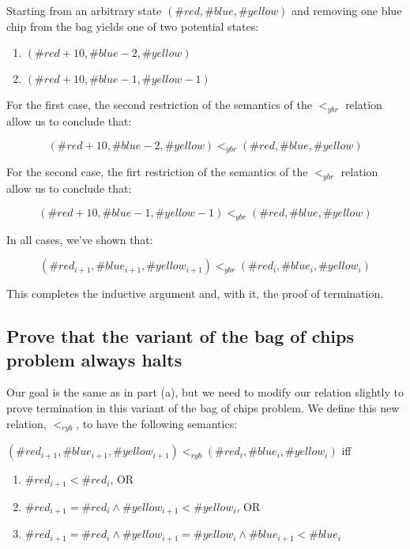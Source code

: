 \documentclass{article}
\begin{document}
\medskip
\noindent Starting from an arbitrary state $(\#red, \#blue, \#yellow)$ and removing one blue chip from the bag yields one of two potential states:

\begin{enumerate}
  \item $(\#red + 10, \#blue - 2, \#yellow)$
  \item $(\#red + 10, \#blue - 1, \#yellow - 1)$
\end{enumerate}

\medskip
\noindent For the first case, the second restriction of the semantics of the $<_{ybr}$ relation allow us to conclude that:

$$
(\#red + 10, \#blue - 2, \#yellow) <_{ybr} (\#red, \#blue, \#yellow)
$$

\medskip
\noindent For the second case, the firt restriction of the semantics of the $<_{ybr}$ relation allow us to conclude that:

$$
(\#red + 10, \#blue - 1, \#yellow - 1) <_{ybr} (\#red, \#blue, \#yellow)
$$

\medskip
\noindent In all cases, we've shown that:

$$
(\#red_{i + 1}, \#blue_{i + 1}, \#yellow_{i + 1}) <_{ybr}(\#red_i, \#blue_i, \#yellow_i)
$$

\medskip
\noindent This completes the inductive argument and, with it, the proof of termination.

\subsection{Prove that the variant of the bag of chips problem always halts}

\noindent Our goal is the same as in part (a), but we need to modify our relation slightly to prove termination in this variant of the bag of chips problem. We define this new relation, $<_{ryb}$, to have the following semantics:

$(\#red_{i + 1}, \#blue_{i + 1}, \#yellow_{i + 1}) <_{ryb} (\#red_i, \#blue_i, \#yellow_i)$ iff

\begin{enumerate}
  \item $\#red_{i + 1} < \#red_i$, OR
  \item $\#red_{i + 1} = \#red_i \land \#yellow_{i + 1} < \#yellow_i$, OR
  \item $\#red_{i + 1} = \#red_i \land \#yellow_{i + 1} = \#yellow_i \land \#blue_{i + 1} < \#blue_i$
\end{enumerate}
\end{document}
